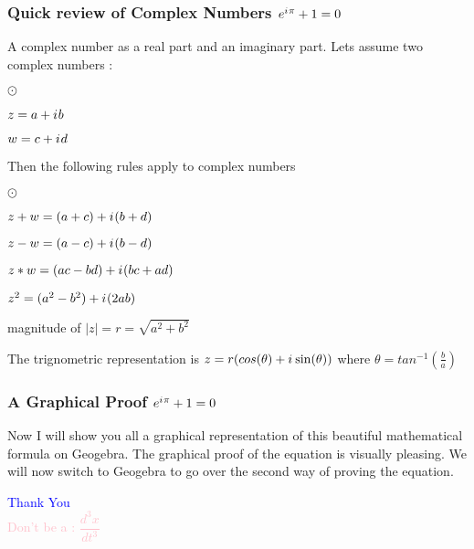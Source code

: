 \documentclass[10pt]{beamer}
\newcommand{\iu}{{i\mkern1mu}}
\begin{document}
\begin{frame}
	\frametitle{Quick review of Complex Numbers \hspace{25pt} \textcolor{pink}{\Huge\(e^{\iu \pi} +1 = 0\)}}
	A complex number as a real part and an imaginary part.  Lets assume two complex numbers :
	\begin{list}{$\odot$}{}
		\item  $z = a+\iu b$
		\item  $w = c+\iu d$
	\end{list}
Then the following rules apply to complex numbers
	\begin{list}{$\odot$}{}
		\item $ z+w = (a+c) + \iu(b+d) $\\
		
		\item $ z-w = (a-c) + \iu(b-d) $ \\
		
		\item $ z*w = (ac-bd) +\iu(bc+ad)$
		
		\item $z^2 = (a^2-b^2) +\iu(2ab)$ \\
		
		\item magnitude of $|z| = r = \sqrt{a^2 +b^2}$ 
		
		\item The trignometric representation is $z = r(cos(\theta)+\iu\sin(\theta))$ where $\theta = tan^{-1}(\frac{b}{a})$
		
	\end{list}
\end{frame}

\begin{frame}
	\frametitle{A Graphical Proof \hspace{25pt} \textcolor{pink}{\Huge\(e^{\iu \pi} +1  = 0\)}}
	Now I will show you all a graphical representation of this beautiful mathematical formula on Geogebra. The graphical proof of the equation is visually pleasing. We will now switch to Geogebra to go over the second way of proving the equation.
\end{frame}


\begin{frame}
	\begin{center}
		\Huge \textcolor{blue}{Thank You} \\
		\vspace{25pt}
		\huge \textcolor{pink}{Don't be a : ${\dfrac{d^3x}{dt^3}}$}
	\end{center}
\end{frame}
\end{document}
